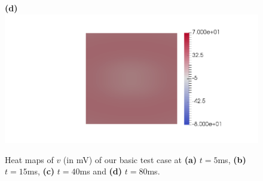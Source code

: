 \documentclass[12pt,a4paper]{article}
\begin{document}
\begin{figure}
\begin{minipage}{0.47\textwidth}
  \textbf{(d)} \includegraphics[trim=9cm 0cm 2cm 0cm, clip=true, width=0.9\linewidth]{v90}
    \end{minipage}
    \caption{Heat maps of $v$ (in mV) of our basic test case at \textbf{(a)} $t=5$ms, \textbf{(b)} $t=15$ms, \textbf{(c)} $t=40$ms and \textbf{(d)} $t=80$ms.}
    \label{fig:1}
\end{figure}
\end{document}
